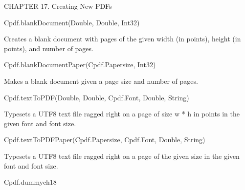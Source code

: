 CHAPTER 17. Creating New PDFs

Cpdf.blankDocument(Double, Double, Int32)

Creates a blank document with
pages of the given width (in points), height (in points), and number of
pages.

Cpdf.blankDocumentPaper(Cpdf.Papersize, Int32)

Makes a blank document given
a page size and number of pages.

Cpdf.textToPDF(Double, Double, Cpdf.Font, Double, String)

Typesets a UTF8 text file
ragged right on a page of size w * h in points in the given font and font
size.

Cpdf.textToPDFPaper(Cpdf.Papersize, Cpdf.Font, Double, String)

Typesets a UTF8 text file
ragged right on a page of the given size in the given font and font size.

Cpdf.dummych18

